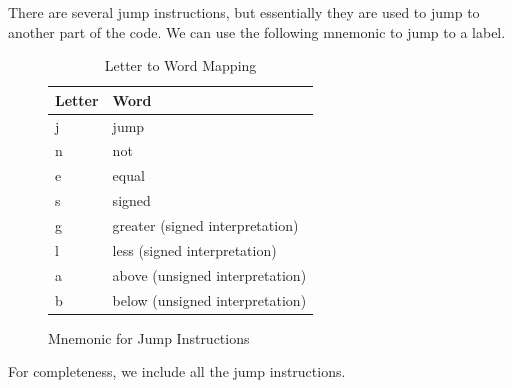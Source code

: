 \documentclass{article}
\begin{document}
      \begin{definition}[Jump]
        There are several jump instructions, but essentially they are used to jump to another part of the code. We can use the following mnemonic to jump to a label. 

        \begin{figure}[H]
          \centering 
          \begin{table}[H]
            \centering
            \begin{tabular}{|l|l|}
            \hline
            \textbf{Letter} & \textbf{Word} \\ \hline
            j & jump \\ \hline
            n & not \\ \hline
            e & equal \\ \hline
            s & signed \\ \hline
            g & greater (signed interpretation) \\ \hline
            l & less (signed interpretation) \\ \hline
            a & above (unsigned interpretation) \\ \hline
            b & below (unsigned interpretation) \\ \hline
            \end{tabular}
            \caption{Letter to Word Mapping}
            \label{table:letter_word_mapping}
          \end{table}
          \caption{Mnemonic for Jump Instructions} 
          \label{fig:jump_instructions_mnemonic}
        \end{figure}

        For completeness, we include all the jump instructions. 
          

\end{definition}
\end{document}
